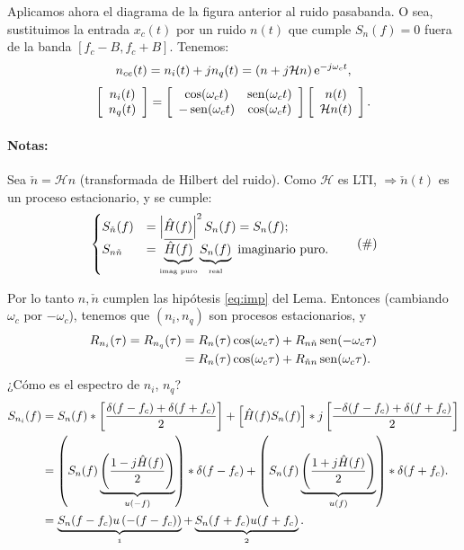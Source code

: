 Aplicamos ahora el diagrama de la figura anterior al ruido pasabanda. O sea, sustituimos la
entrada $x_c(t)$ por un ruido $n(t)$ que cumple $S_n(f)=0$ fuera de la
banda $[f_c-B,f_c+B]$. Tenemos: 
\[
n_{ce}(t)=n_i(t)+jn_q(t) = \left(n + j\mathcal{H}n\right)
\mathrm{e}^{-j\omega_ct},\]
\begin{equation*}
    \left[\begin{array}{c}
            n_i(t)\\
            n_q(t)
          \end{array}\right]
    = \left[\begin{array}{cc}
                \cos(\omega_ct) & \operatorname{sen}(\omega_ct)\\
                -\operatorname{sen}(\omega_ct) & \cos(\omega_ct)
            \end{array}\right]
    \left[\begin{array}{c}
            n(t)\\
            \mathcal{H}n(t)
          \end{array}\right].
\end{equation*}

\paragraph{Notas:} Sea $\check{n}=\mathcal{H}n$ (transformada de Hilbert del ruido).
Como $\mathcal{H}$ es LTI, $\Rightarrow \check{n}(t)$ es un
proceso estacionario, y se cumple:
\[\begin{cases} S_{\check{n}}(f)& =\left|\hat{H}(f)\right|^2S_n(f)=S_n(f);\\
                S_{n\check{n}} &= \underbrace{\overline{\hat{H}(f)}}_{\text{\tiny imag puro}}\underbrace{S_n(f)}_{\text{\tiny  real}}    
    \text{  imaginario
                puro}.
              \end{cases}\tag{\#}\]


Por lo tanto $n, \check{n}$ cumplen las hipótesis \eqref{eq:imp} del
Lema. Entonces (cambiando $\omega_c$ por $-\omega_c$), tenemos que
$(n_i,n_q)$ son procesos estacionarios, y
\begin{align*}
    R_{n_i}(\tau)=R_{n_q}(\tau) & = R_n(\tau)\cos(\omega_c\tau)+R_{n\check{n}}\operatorname{sen}(-\omega_c\tau)\\
                    & = R_{n}(\tau)\cos(\omega_c\tau) +
                    R_{\check{n}n}\operatorname{sen}(\omega_c\tau).
\end{align*}
¿Cómo es el espectro de $n_i$, $n_q$?
\begin{align*}
    S_{n_i}(f)  & = S_n(f) \ast \left[\frac{\delta(f-f_c)+\delta(f+f_c)}{2}\right] +
              \left[\hat{H}(f)S_n(f)\right]\ast j\left[\frac{-\delta(f-f_c)+\delta(f+f_c)}{2}\right]\\
            & = \left(S_n(f)\underbrace{\left(\frac{1-j\hat{H}(f)}{2}\right)}_{u(-f)}\right)\ast\delta(f-f_c)+
            \left(S_n(f)\underbrace{\left(\frac{1+j\hat{H}(f)}{2}\right)}_{u(f)}\right)\ast\delta(f+f_c).\\
& = \underbrace{S_n(f-f_c)u\left(-(f-f_c)\right)}_{\oldstylenums{1}}+
    \underbrace{S_n(f+f_c)u(f+f_c)}_{\oldstylenums{2}}.
\end{align*}

